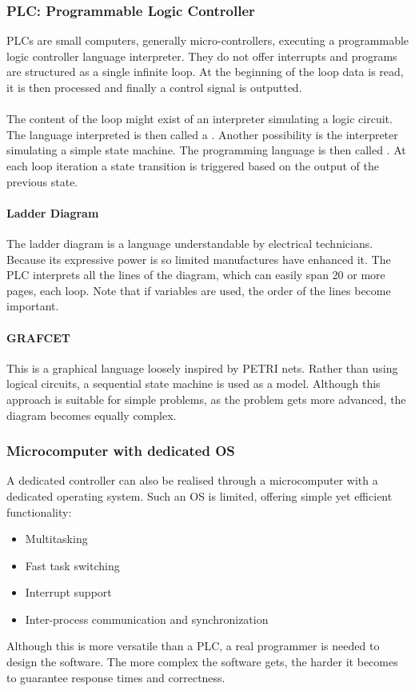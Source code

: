 \documentclass[../main.tex]{subfiles}
\begin{document}
\subsubsection{PLC: Programmable Logic Controller}
PLCs are small computers, generally micro-controllers, executing a programmable logic controller language interpreter. They do not offer interrupts and programs are structured as a single infinite loop. At the beginning of the loop data is read, it is then processed and finally a control signal is outputted.
\\\\
The content of the loop might exist of an interpreter simulating a logic circuit. The language interpreted is then called a . Another possibility is the interpreter simulating a simple state machine. The programming language is then called . At each loop iteration a state transition is triggered based on the output of the previous state.

\paragraph{Ladder Diagram}
The ladder diagram is a language understandable by electrical technicians. Because its expressive power is so limited manufactures have enhanced it. The PLC interprets all the lines of the diagram, which can easily span 20 or more pages, each loop. Note that if variables are used, the order of the lines become important.

\paragraph{GRAFCET} This is a graphical language loosely inspired by PETRI nets. Rather than using logical circuits, a sequential state machine is used as a model. Although this approach is suitable for simple problems, as the problem gets more advanced, the diagram becomes equally complex.

\subsubsection{Microcomputer with dedicated OS}
A dedicated controller can also be realised through a microcomputer with a dedicated operating system. Such an OS is limited, offering simple yet efficient functionality:
\begin{itemize}
	\item Multitasking
	\item Fast task switching
	\item Interrupt support
	\item Inter-process communication and synchronization
\end{itemize}
Although this is more versatile than a PLC, a real programmer is needed to design the software. The more complex the software gets, the harder it becomes to guarantee response times and correctness.
\end{document}
